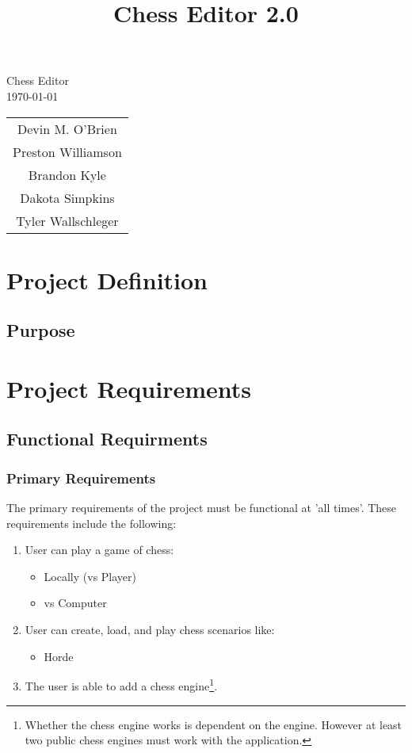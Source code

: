 \documentclass{article}
\title{Chess Editor 2.0}
\begin{document}
\begin{titlepage}
\begin{center}
\vspace{1cm}
\huge Chess Editor\\
\normalsize
\vspace{1cm}
\today\\
\vspace{1cm}
\begin{tabular}{c}
Devin M. O'Brien \\
Preston Williamson\\
Brandon Kyle\\
Dakota Simpkins\\
Tyler Wallschleger
\end{tabular}
\end{center}
\end{titlepage}
\section{Project Definition}
\subsection{Purpose}

\section{Project Requirements}

\subsection{Functional Requirments}

\subsubsection{Primary Requirements}
The primary requirements of the project must be functional at 'all times'. These requirements include the following:
\begin{enumerate}
\item User can play a game of chess:
\begin{itemize}
\item Locally (vs Player)
\item vs Computer
\end{itemize}

\item User can create, load, and play chess scenarios like:

\begin{itemize}
\item Horde

\end{itemize}

\item The user is able to add a chess engine\footnote{Whether the chess engine works is dependent on the engine. However at least two public chess engines must work with the application.}.
\end{enumerate}
\end{document}

